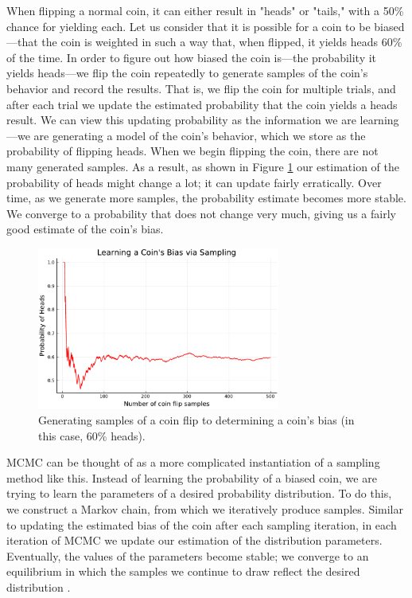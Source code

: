 \documentclass[sigplan,screen]{acmart}
\begin{document}
When flipping a normal coin, it can either result in "heads" or "tails," with a 50\% chance for yielding each. Let us consider that it is possible for a coin to be biased---that the coin is weighted in such a way that, when flipped, it yields heads 60\% of the time. In order to figure out how biased the coin is---the probability it yields heads---we flip the coin repeatedly to generate samples of the coin's behavior and record the results. That is, we flip the coin for multiple trials, and after each trial we update the estimated probability that the coin yields a heads result. We can view this updating probability as the information we are learning---we are generating a model of the coin's behavior, which we store as the probability of flipping heads. When we begin flipping the coin, there are not many generated samples. As a result, as shown in Figure \ref{fig:coinflip} our estimation of the probability of heads might change a lot; it can update fairly erratically. Over time, as we generate more samples, the probability estimate becomes more stable. We converge to a probability that does not change very much, giving us a fairly good estimate of the coin's bias.  

\begin{figure}[h]
	\includegraphics[width=8cm]{figs/flip.pdf}
	\caption{Generating samples of a coin flip to determining a coin's bias (in this case, 60\% heads).}
	\label{fig:coinflip}
\end{figure}

MCMC can be thought of as a more complicated instantiation of a sampling method like this. Instead of learning the probability of a biased coin, we are trying to learn the parameters of a desired probability distribution. To do this, we construct a Markov chain, from which we iteratively produce samples. Similar to updating the estimated bias of the coin after each sampling iteration, in each iteration of MCMC we update our estimation of the distribution parameters. Eventually, the values of the parameters become stable; we converge to an equilibrium in which the samples we continue to draw reflect the desired distribution \cite{brooks2011handbook}.
\end{document}
